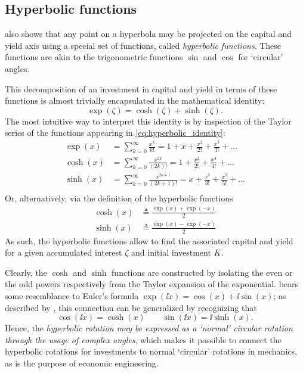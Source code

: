 \subsection{Hyperbolic functions}
 also shows that any point on a hyperbola may be projected on the capital and yield axis using a special set of functions, called \emph{hyperbolic functions}. These functions are akin to the trigonometric functions $\sin$ and $\cos$ for `circular' angles.

This decomposition of an investment in capital and yield in terms of these functions is almost trivially encapsulated in the mathematical identity:
\begin{equation}
    \exp(\zeta) = \cosh(\zeta) + \sinh(\zeta).
    \label{eq:hyperbolic_identity}
\end{equation}
The most intuitive way to interpret this identity is by inspection of the Taylor series of the functions appearing in \cref{eq:hyperbolic_identity}:
\begin{equation}
    \begin{split}
        \exp(x) &= \sum_{k = 0}^\infty \frac{x^k}{k!} = 1 + x + \frac{x^2}{2!} + \frac{x^3}{3!} + \ldots\\
        \cosh(x) &= \sum_{k = 0}^\infty \frac{x^{2k}}{(2k)!} = 1 + \frac{x^2}{2!} + \frac{x^4}{4!} + \ldots\\
        \sinh(x) &= \sum_{k = 0}^\infty \frac{x^{2k + 1}}{(2k + 1)!} = x + \frac{x^3}{3!} + \frac{x^5}{5!} + \ldots\\
    \end{split}
\end{equation}
Or, alternatively, via the definition of the hyperbolic functions
\begin{equation}
    \begin{split}
        \cosh(x) &\triangleq \frac{\exp(x) + \exp(-x)}{2}\\
        \sinh(x) &\triangleq \frac{\exp(x) - \exp(-x)}{2}
    \end{split}
\end{equation}
As such, the hyperbolic functions allow to find the associated capital and yield for a given accumulated interest $\zeta$ and initial investment $K$.

Clearly, the \(\cosh\) and \(\sinh\) functions are constructed by isolating the even or the odd powers respectively from the Taylor expansion of the exponential.  bears some resemblance to Euler's formula \(\exp(\ii x) = \cos(x) + \ii \sin(x)\); as described by \citet{Needham1997}, this connection can be generalized by recognizing that
\begin{equation}
     \cos(\ii x) = \cosh(x) \qquad \sin(\ii x) = \ii\sinh(x).
     \label{eq:trig_functions}
\end{equation}
Hence, the \emph{hyperbolic rotation may be expressed as a `normal' circular rotation through the usage of complex angles}, which makes it possible to connect the hyperbolic rotations for investments to normal `circular' rotations in mechanics, as is the purpose of economic engineering.


